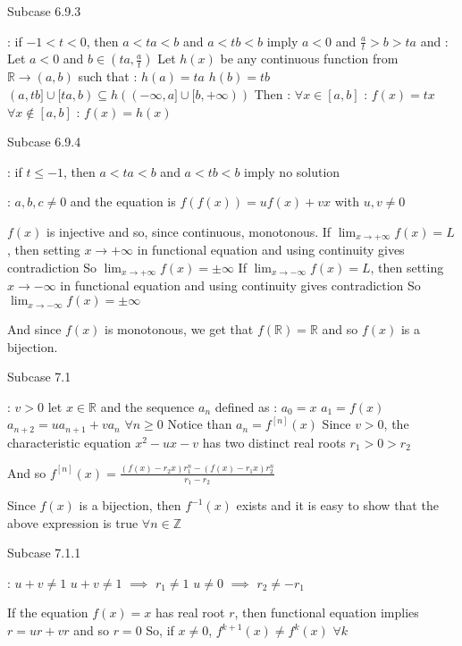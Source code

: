 \begin{solution}
\begin{tcolorbox}
\begin{bolded}Subcase 6.9.3\end{bolded} : if $-1< t<0$, then $a< ta<b$ and $a< tb< b$ imply $a< 0$ and $\frac at> b> ta$ and :
Let $a<0$ and $b\in(ta,\frac at)$
Let $h(x)$ be any continuous function from $\mathbb R\to(a,b)$ such that :
$h(a)=ta$
$h(b)=tb$
$(a,tb]\cup[ta,b)\subseteq h((-\infty,a]\cup[b,+\infty))$
Then :
$\forall x\in[a,b]$ : $f(x)=tx$
$\forall x\notin[a,b]$ : $f(x)=h(x)$

\begin{bolded}Subcase 6.9.4\end{bolded} : if $t\le -1$, then $a< ta<b$ and $a< tb< b$ imply no solution


 : $a,b,c\ne 0$ and the equation is $f(f(x))=uf(x)+vx$ with $u,v\ne 0$

$f(x)$ is injective and so, since continuous, monotonous.
If $\lim_{x\to+\infty}f(x)=L$, then setting $x\to+\infty$ in functional equation and using continuity gives contradiction
So $\lim_{x\to+\infty}f(x)=\pm\infty$
If $\lim_{x\to-\infty}f(x)=L$, then setting $x\to-\infty$ in functional equation and using continuity gives contradiction
So $\lim_{x\to-\infty}f(x)=\pm\infty$

And since $f(x)$ is monotonous, we get that $f(\mathbb R)=\mathbb R$ and so $f(x)$ is a bijection.

\begin{bolded}Subcase 7.1\end{bolded} : $v>0$
let $x\in\mathbb R$ and the sequence $a_n$ defined as :
$a_0=x$
$a_1=f(x)$
$a_{n+2}=ua_{n+1}+va_n$ $\forall n\ge 0$
Notice than $a_n=f^{[n]}(x)$
Since $v>0$, the characteristic equation $x^2-ux-v$ has two distinct real roots $r_1>0>r_2$

And so $f^{[n]}(x)=\frac{(f(x)-r_2x)r_1^n-(f(x)-r_1x)r_2^n}{r_1-r_2}$

Since $f(x)$ is a bijection, then $f^{-1}(x)$ exists and it is easy to show that the above expression is true $\forall n\in\mathbb Z$

\begin{bolded}Subcase 7.1.1\end{bolded} : $u+v\ne 1$ 
$u+v\ne 1$ $\implies$ $r_1\ne 1$
$u\ne 0$ $\implies$ $r_2\ne -r_1$

If the equation $f(x)=x$ has real root $r$, then functional equation implies $r=ur+vr$ and so $r=0$
So, if $x\ne 0$, $f^{k+1}(x)\ne f^k(x)$ $\forall k$


\end{tcolorbox}
\end{solution}
